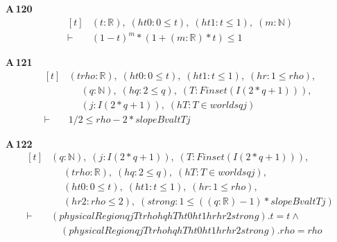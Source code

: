 \noindent\textbf{A\,120}\quad{}
{\footnotesize\[ \begin{aligned}[t]
&(\mathit{t} : \mathbb{R} ),\; (\mathit{ht0} : 0 \leq \mathit{t}),\; (\mathit{ht1} : \mathit{t} \leq 1),\; (\mathit{m} : \mathbb{N} )\\
\vdash\;&(1-\mathit{t})^{\mathit{m}}*(1+(\mathit{m}:\mathbb{R} )*\mathit{t}) \leq 1
\end{aligned} \]}

\noindent\textbf{A\,121}\quad{}
{\footnotesize\[ \begin{aligned}[t]
&(\mathit{t} \mathit{rho} : \mathbb{R} ),\; (\mathit{ht0} : 0 \leq \mathit{t}),\; (\mathit{ht1} : \mathit{t} \leq 1),\; (\mathit{hr} : 1 \leq \mathit{rho}),\\
&\quad \; (\mathit{q} : \mathbb{N} ),\; (\mathit{hq} : 2 \leq \mathit{q}),\; (\mathit{T} : \mathit{Finset} (\mathit{I} (2*\mathit{q}+1))),\\
&\quad \; (\mathit{j} : \mathit{I} (2*\mathit{q}+1)),\; (\mathit{hT} : \mathit{T} \in \mathit{worlds} \mathit{q} \mathit{j})\\
\vdash\;&1/2 \leq \mathit{rho}-2*\mathit{slopeBval} \mathit{t} \mathit{T} \mathit{j}
\end{aligned} \]}

\noindent\textbf{A\,122}\quad{}
{\footnotesize\[ \begin{aligned}[t]
&(\mathit{q} : \mathbb{N} ),\; (\mathit{j} : \mathit{I} (2*\mathit{q}+1)),\; (\mathit{T} : \mathit{Finset} (\mathit{I} (2*\mathit{q}+1))),\\
&\quad \; (\mathit{t} \mathit{rho} : \mathbb{R} ),\; (\mathit{hq} : 2 \leq \mathit{q}),\; (\mathit{hT} : \mathit{T} \in \mathit{worlds} \mathit{q} \mathit{j}),\\
&\quad \; (\mathit{ht0} : 0 \leq \mathit{t}),\; (\mathit{ht1} : \mathit{t} \leq 1),\; (\mathit{hr} : 1 \leq \mathit{rho}),\\
&\quad \; (\mathit{hr2} : \mathit{rho} \leq 2),\; (\mathit{strong} : 1 \leq ((\mathit{q}:\mathbb{R} )-1)*\mathit{slopeBval} \mathit{t} \mathit{T} \mathit{j})\\
\vdash\;&(\mathit{physicalRegion} \mathit{q} \mathit{j} \mathit{T} \mathit{t} \mathit{rho} \mathit{hq} \mathit{hT} \mathit{ht0} \mathit{ht1} \mathit{hr} \mathit{hr2} \mathit{strong}).\mathit{t} = \mathit{t} \wedge\\
&\quad (\mathit{physicalRegion} \mathit{q} \mathit{j} \mathit{T} \mathit{t} \mathit{rho} \mathit{hq} \mathit{hT} \mathit{ht0} \mathit{ht1} \mathit{hr} \mathit{hr2} \mathit{strong}).\mathit{rho} = \mathit{rho}
\end{aligned} \]}

